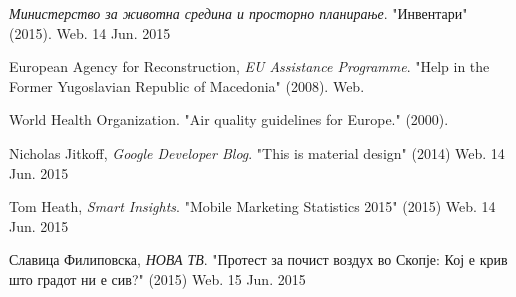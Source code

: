 \documentclass{uvamscse}
\begin{document}


\begin{thebibliography}{1}
\emph{Министерство за животна средина и просторно планирање}. "Инвентари" (2015). Web. 14 Jun. 2015

European Agency for Reconstruction, \emph{EU Assistance Programme}. "Help in the Former Yugoslavian Republic of Macedonia" (2008). Web.

World Health Organization. "Air quality guidelines for Europe." (2000).

Nicholas Jitkoff, \emph{Google Developer Blog}. "This is material design" (2014) Web. 14 Jun. 2015

Tom Heath, \emph{Smart Insights}. "Mobile Marketing Statistics 2015" (2015) Web. 14 Jun. 2015

Славица Филиповска, \emph{НОВА ТВ}. "Протест за почист воздух во Скопје: Кој е крив што градот ни е сив?" (2015) Web. 15 Jun. 2015


\end{thebibliography}
\end{document}
